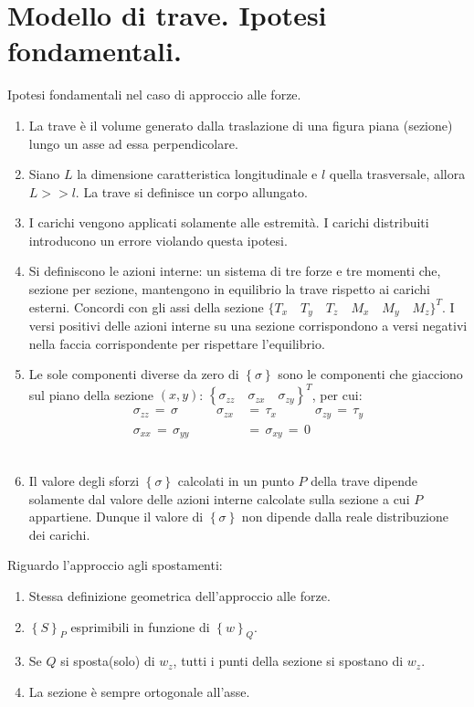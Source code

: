 \section{Modello di trave. Ipotesi fondamentali.}
Ipotesi fondamentali nel caso di approccio alle forze.
\begin{enumerate}
    \item La trave è il volume generato dalla traslazione di una figura piana (sezione) lungo un asse ad essa perpendicolare.\\
    \item Siano $L$ la dimensione caratteristica longitudinale e $l$ quella trasversale, allora $L>>l$. La trave si definisce un corpo allungato.\\
    \item I carichi vengono applicati solamente alle estremità. I carichi distribuiti introducono un errore violando questa ipotesi.\\
    \item Si definiscono le azioni interne: un sistema di tre forze e tre momenti che, sezione per sezione, mantengono in equilibrio la trave rispetto ai carichi esterni. Concordi con gli assi della sezione $\{ T_x \quad T_y \quad T_z \quad M_x \quad M_y \quad M_z \}^T$. I versi positivi delle azioni interne su una sezione corrispondono a versi negativi nella faccia corrispondente per rispettare l'equilibrio.\\
    \item Le sole componenti diverse da zero di $\left\{\sigma\right\}$ sono le componenti che giacciono sul piano della sezione $(x,y)$: $\left\{ \sigma_{zz} \quad \sigma_{zx} \quad \sigma_{zy} \right\}^T$, per cui:
    \begin{align*}
        \sigma_{zz} \,=\, \sigma \quad\quad\quad \sigma_{zx}\,&=\,\tau_x \quad\quad\quad \sigma_{zy} \,=\,\tau_y\\
         \sigma_{xx}\,=\,\sigma_{yy}\,&=\,\sigma_{xy}\,=\,0
    \end{align*}\\
    \item Il valore degli sforzi $\left\{\sigma\right\}$ calcolati in un punto $P$ della trave dipende solamente dal valore delle azioni interne calcolate sulla sezione a cui $P$ appartiene. Dunque il valore di $\left\{\sigma\right\}$ non dipende dalla reale distribuzione dei carichi.
\end{enumerate}

Riguardo l'approccio agli spostamenti:
\begin{enumerate}
    \item Stessa definizione geometrica dell'approccio alle forze.\\
    \item $\left\{S\right\}_P$ esprimibili in funzione di $\left\{w\right\}_Q$.\\
    \item Se $Q$ si sposta(solo) di $w_z$, tutti i punti della sezione si spostano di $w_z$.\\
    \item La sezione è sempre ortogonale all'asse.
\end{enumerate}